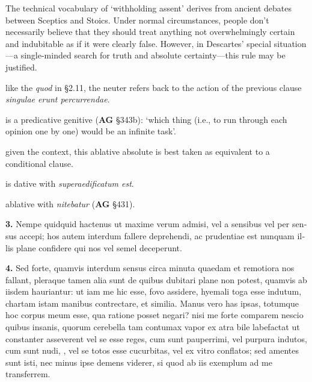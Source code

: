  The technical vocabulary of `withholding assent' derives from ancient debates between Sceptics and Stoics. Under normal circumstances, people don't necessarily believe that they should treat anything not overwhelmingly certain and indubitable as if it were clearly false. However, in Descartes' special situation---a single-minded search for truth and absolute certainty---this rule may be justified.

 like the \textit{quod} in §2.11, the neuter refers back to the action of the previous clause \textit{singulae erunt percurrendae}.

 is a predicative genitive (\textbf{AG} §343b): `which thing (i.e., to run through each opinion one by one) would be an infinite task'.

 given the context, this ablative absolute is best taken as equivalent to a conditional clause.

 is dative with \textit{superaedificatum est}.

 ablative with \textit{nitebatur} (\textbf{AG} §431).


\clearpage

\beginnumbering
\pstart
\begin{latin}
    \textenglish{\textbf{3.}} Nempe quidquid hactenus ut maxime verum admisi, vel a sensibus vel per sensus accepi; hos autem interdum fallere deprehendi, ac prudentiae est nunquam illis plane confidere qui nos vel semel deceperunt.
\end{latin}
\pend
\endnumbering

\beginnumbering
\pstart
\begin{latin}
    \textenglish{\textbf{4.}} Sed forte, quamvis interdum sensus circa minuta quaedam et remotiora nos fallant, pleraque tamen alia sunt de quibus dubitari plane non potest, quamvis ab iisdem hauriantur: ut iam me hic esse, fovo assidere, hyemali toga esse indutum, chartam istam manibus contrectare, et similia. Manus vero has ipsas, totumque hoc corpus meum esse, qua ratione posset negari? nisi me forte comparem nescio quibus insanis, quorum cerebella tam contumax vapor ex atra bile labefactat ut constanter asseverent vel se esse reges, cum sunt pauperrimi, vel purpura indutos, cum sunt nudi, , vel se totos esse cucurbitas, vel ex vitro conflatos; sed amentes sunt isti, nec minus ipse demens viderer, si quod ab iis exemplum ad me transferrem.
\end{latin}
\pend
\endnumbering

